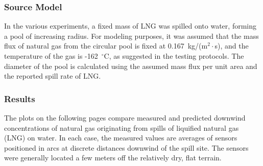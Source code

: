 \subsubsection{Source Model}

In the various experiments, a fixed mass of LNG was spilled onto water, forming a pool of increasing radius. For modeling purposes, it was assumed that the mass flux of natural gas from the circular pool is fixed at 0.167~kg/(m$^2 \cdot$s), and the temperature of the gas is -162~$^\circ$C, as suggested in the testing protocols. The diameter of the pool is calculated using the assumed mass flux per unit area and the reported spill rate of LNG.



\subsubsection{Results}

The plots on the following pages compare measured and predicted downwind concentrations of natural gas originating from spills of liquified natural gas (LNG) on water. In each case, the measured values are averages of sensors positioned in arcs at discrete distances downwind of the spill site. The sensors were generally located a few meters off the relatively dry, flat terrain.


